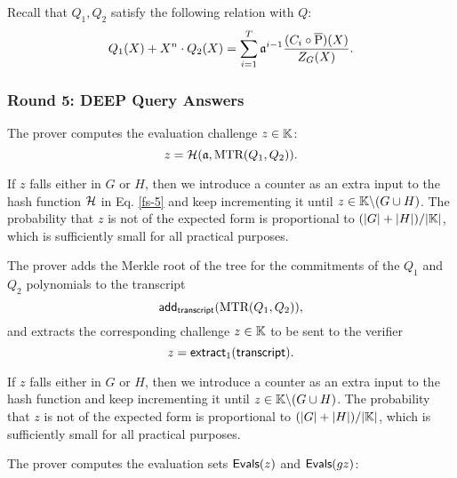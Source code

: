 Recall that $Q_1,Q_2$ satisfy the following relation with $Q$:
\begin{equation}\label{eq:ali-check2}
  Q_1(X) + X^n \cdot Q_2(X) = \sum_{i=1}^T \mathfrak{a}^{i-1} \frac{(C_i \circ \overline{\text{P}})(X)}{Z_G(X)}.
\end{equation}



\subsubsection*{Round 5: DEEP Query Answers}

\ifNOPOLYGON
The prover computes the evaluation challenge $z \in \mathbb{K}$: 
\begin{equation}\label{fs-5}
  z = \mathcal{H}(\mathfrak{a},\text{MTR}(Q_1,Q_2)).
\end{equation}

If $z$ falls either in $G$ or $H$, then we introduce a counter as an extra input to the hash function $\mathcal{H}$ in Eq. \eqref{fs-5} and keep incrementing it until $z \in \mathbb{K} \backslash (G \cup H)$. The probability that $z$ is not of the expected form is proportional to $(|G|+|H|)/|\mathbb{K}|$, which is sufficiently small for all practical purposes.
\fi

\ifPOLYGON
The prover adds the Merkle root of the tree for the commitments of the $Q_1$ and $Q_2$ polynomials to the transcript
\[
\textsf{add}_{\textsf{transcript}}(\text{MTR}(Q_1, Q_2)),
\]
and extracts the corresponding challenge $z \in \mathbb{K}$ to be sent to the verifier
\[
z = \mathsf{extract}_{1}(\textsf{transcript}).
\]

If $z$ falls either in $G$ or $H$, then we introduce a counter as an extra input to the hash function and keep incrementing it until $z \in \mathbb{K} \backslash (G \cup H)$. The probability that $z$ is not of the expected form is proportional to $(|G|+|H|)/|\mathbb{K}|$, which is sufficiently small for all practical purposes.
\fi

The prover computes the evaluation sets $\textsf{Evals}(z)$ and $\textsf{Evals}(gz)$:

